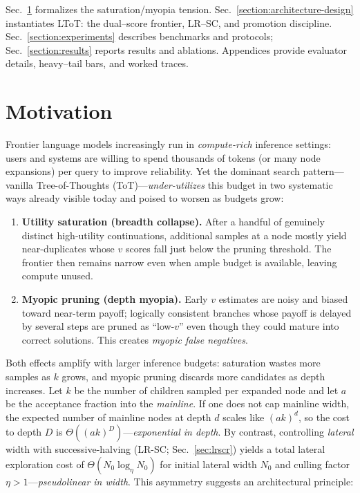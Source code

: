 \documentclass{article}
\begin{document}
Sec.~\ref{section:motivation} formalizes the saturation/myopia tension.
Sec.~\ref{section:architecture-design} instantiates LToT: the dual--score frontier, LR--SC, and promotion discipline.
Sec.~\ref{section:experiments} describes benchmarks and protocols; Sec.~\ref{section:results} reports results and ablations.
Appendices provide evaluator details, heavy--tail bars, and worked traces.
\section{Motivation}
\label{section:motivation}
Frontier language models increasingly run in \emph{compute-rich} inference settings:
users and systems are willing to spend thousands of tokens (or many node expansions) per query to improve reliability.
Yet the dominant search pattern—vanilla Tree-of-Thoughts (ToT)—\emph{under-utilizes} this budget in two systematic ways already visible today and poised to worsen as budgets grow:
\begin{enumerate}[leftmargin=*, itemsep=2pt, topsep=2pt]
    \item \textbf{Utility saturation (breadth collapse).} After a handful of genuinely distinct high-utility continuations, additional samples at a node mostly yield near-duplicates whose $v$ scores fall just below the pruning threshold. The frontier then remains narrow even when ample budget is available, leaving compute unused.
    \item \textbf{Myopic pruning (depth myopia).} Early $v$ estimates are noisy and biased toward near-term payoff; logically consistent branches whose payoff is delayed by several steps are pruned as ``low-$v$'' even though they could mature into correct solutions. This creates \emph{myopic false negatives}.
\end{enumerate}
Both effects amplify with larger inference budgets: saturation wastes more samples as $k$ grows, and myopic pruning discards more candidates as depth increases.
Let $k$ be the number of children sampled per expanded node and let $a$ be the acceptance fraction into the \emph{mainline}.
If one does not cap mainline width, the expected number of mainline nodes at depth $d$ scales like $(ak)^d$, so the cost to depth $D$ is $\Theta((ak)^D)$—\emph{exponential in depth}.
By contrast, controlling \emph{lateral} width with successive-halving (LR-SC; Sec.~\ref{sec:lrscr}) yields a total lateral exploration cost of $\Theta(N_0 \log_{\eta} N_0)$ for initial lateral width $N_0$ and culling factor $\eta>1$—\emph{pseudolinear in width}.
This asymmetry suggests an architectural principle:
\end{document}
